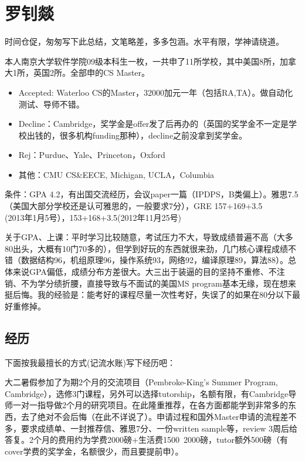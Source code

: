 \section{罗钊燚}
时间仓促，匆匆写下此总结，文笔略差，多多包涵。水平有限，学神请绕道。\par

本人南京大学软件学院09级本科生一枚，一共申了11所学校，其中美国8所，加拿大1所，英国2所。全部申的CS Master。\par
\begin{itemize}
\item Accepted: Waterloo CS的Master，32000加元一年（包括RA,TA）。做自动化测试、导师不错。
\item Decline：Cambridge，奖学金是offer发了后再办的（英国的奖学金不一定是学校出钱的，很多机构funding那种），decline之前没拿到奖学金。
\item Rej：Purdue、Yale、Princeton，Oxford
\item 其他：CMU CS\&EECE, Michigan, UCLA，Columbia
\end{itemize}\par
条件：GPA 4.2，有出国交流经历，会议paper一篇（IPDPS，B类偏上）。雅思7.5（美国大部分学校还是认可雅思的，一般要求7分），GRE 157+169+3.5\\(2013年1月5号），153+168+3.5(2012年11月25号) \par
关于GPA、上课：平时学习比较随意，考试压力不大，导致成绩普遍不高（大多80出头，大概有10门70多的），但学到好玩的东西就很来劲，几门核心课程成绩不错（数据结构96，机组原理96，操作系统93，网络92，编译原理89，算法88）。总体来说GPA偏低，成绩分布方差很大。大三出于装逼的目的坚持不重修、不注销、不为学分绩折腰，直接导致与不面试的美国MS program基本无缘，现在想来挺后悔。我的经验是：能考好的课程尽量一次性考好，失误了的如果在80分以下最好重修掉。\par 
\subsection{经历}
下面按我最擅长的方式(记流水账)写下经历吧：\par

大二暑假参加了为期2个月的交流项目（Pembroke-King’s Summer Program, Cambridge），选修3门课程，另外可以选择tutorship，名额有限，有Cambridge导师一对一指导做2个月的研究项目。在此隆重推荐，在各方面都能学到非常多的东西，去了绝对不会后悔（在此不详说了）。申请过程和国外Master申请的流程差不多，要求成绩单、一封推荐信、雅思7分、一份written sample等，review 3周后给答复。2个月的费用约为学费2000磅+生活费1500~2000磅，tutor额外500磅（有cover学费的奖学金，名额很少，而且要提前申）。\par


